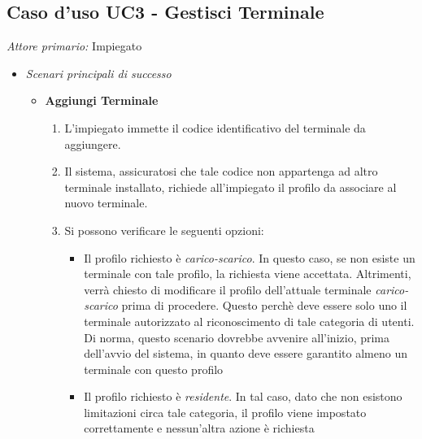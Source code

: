\documentclass[12pt, letterpaper]{article}
\begin{document}
\subsection{Caso d'uso UC3 - Gestisci Terminale}

\emph{Attore primario: } Impiegato

\begin{itemize}
    \item \emph{Scenari principali di successo}
    \begin{itemize}
        \item \textbf{Aggiungi Terminale}
        \begin{enumerate}
            \item L'impiegato immette il codice identificativo del terminale da aggiungere.
            \item Il sistema, assicuratosi che tale codice non appartenga ad altro terminale installato, richiede all'impiegato il profilo da associare al nuovo terminale.
            \item Si possono verificare le seguenti opzioni:
            \begin{itemize}
                \item Il profilo richiesto è \emph{carico-scarico}. In questo caso, se non esiste un terminale con tale profilo, la richiesta viene accettata. Altrimenti, verrà chiesto di modificare il profilo dell'attuale terminale \emph{carico-scarico} prima di procedere. Questo perchè deve essere solo uno il terminale autorizzato al riconoscimento di tale categoria di utenti. Di norma, questo scenario dovrebbe avvenire all'inizio, prima dell'avvio del sistema, in quanto deve essere garantito almeno un terminale con questo profilo
                \item Il profilo richiesto è \emph{residente}. In tal caso, dato che non esistono limitazioni circa tale categoria, il profilo viene impostato correttamente e nessun'altra azione è richiesta
            \end{itemize}
        \end{enumerate}
    \end{itemize}


\end{itemize}
\end{document}
